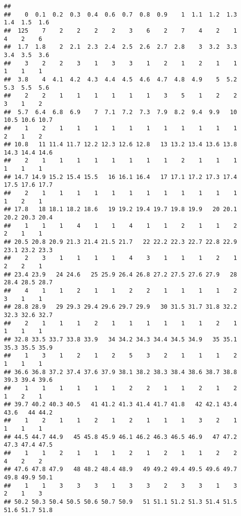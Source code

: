 \documentclass[
]{article}
\begin{document}
\begin{verbatim}
## 
##    0  0.1  0.2  0.3  0.4  0.6  0.7  0.8  0.9    1  1.1  1.2  1.3  1.4  1.5  1.6 
##  125    7    2    2    2    2    3    6    2    7    4    2    1    4    2    6 
##  1.7  1.8    2  2.1  2.3  2.4  2.5  2.6  2.7  2.8    3  3.2  3.3  3.4  3.5  3.6 
##    3    2    2    3    1    3    3    1    2    1    2    1    1    1    1    1 
##  3.8    4  4.1  4.2  4.3  4.4  4.5  4.6  4.7  4.8  4.9    5  5.2  5.3  5.5  5.6 
##    2    2    1    1    1    1    1    1    3    5    1    2    2    3    1    2 
##  5.7  6.4  6.8  6.9    7  7.1  7.2  7.3  7.9  8.2  9.4  9.9   10 10.5 10.6 10.7 
##    1    2    1    1    1    1    1    1    1    1    1    1    1    2    1    2 
## 10.8   11 11.4 11.7 12.2 12.3 12.6 12.8   13 13.2 13.4 13.6 13.8 14.3 14.4 14.6 
##    2    1    1    1    1    1    1    1    1    2    1    1    1    1    1    1 
## 14.7 14.9 15.2 15.4 15.5   16 16.1 16.4   17 17.1 17.2 17.3 17.4 17.5 17.6 17.7 
##    2    1    1    1    1    1    1    1    1    1    1    1    1    1    2    1 
## 17.8   18 18.1 18.2 18.6   19 19.2 19.4 19.7 19.8 19.9   20 20.1 20.2 20.3 20.4 
##    1    1    1    4    1    1    4    1    1    2    1    1    2    2    1    1 
## 20.5 20.8 20.9 21.3 21.4 21.5 21.7   22 22.2 22.3 22.7 22.8 22.9 23.1 23.2 23.3 
##    2    3    1    1    1    1    4    3    1    1    1    2    1    2    2    1 
## 23.4 23.9   24 24.6   25 25.9 26.4 26.8 27.2 27.5 27.6 27.9   28 28.4 28.5 28.7 
##    4    1    1    2    1    1    2    2    1    1    1    1    2    3    1    1 
## 28.8 28.9   29 29.3 29.4 29.6 29.7 29.9   30 31.5 31.7 31.8 32.2 32.3 32.6 32.7 
##    2    1    1    1    2    1    1    1    1    1    1    2    1    1    1    1 
## 32.8 33.5 33.7 33.8 33.9   34 34.2 34.3 34.4 34.5 34.9   35 35.1 35.3 35.5 35.9 
##    1    3    1    2    1    2    5    3    2    1    1    1    2    1    1    1 
## 36.6 36.8 37.2 37.4 37.6 37.9 38.1 38.2 38.3 38.4 38.6 38.7 38.8 39.3 39.4 39.6 
##    1    1    1    1    1    1    2    2    1    1    2    1    2    1    2    1 
## 39.7 40.2 40.3 40.5   41 41.2 41.3 41.4 41.7 41.8   42 42.1 43.4 43.6   44 44.2 
##    1    2    1    1    2    1    2    1    1    1    3    2    1    1    1    1 
## 44.5 44.7 44.9   45 45.8 45.9 46.1 46.2 46.3 46.5 46.9   47 47.2 47.3 47.4 47.5 
##    1    1    2    1    1    1    2    1    2    1    1    2    2    4    2    2 
## 47.6 47.8 47.9   48 48.2 48.4 48.9   49 49.2 49.4 49.5 49.6 49.7 49.8 49.9 50.1 
##    1    1    3    3    3    1    3    3    2    3    3    1    3    2    1    3 
## 50.2 50.3 50.4 50.5 50.6 50.7 50.9   51 51.1 51.2 51.3 51.4 51.5 51.6 51.7 51.8 

\end{verbatim}
\end{document}
